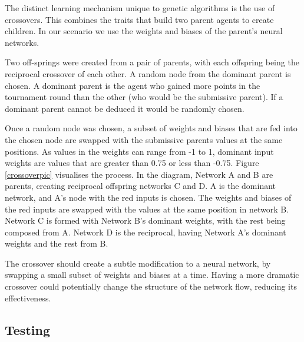\documentclass[12pt,a4paper]{article}
\begin{document}
            The distinct learning mechanism unique to genetic algorithms is the use of crossovers. This combines the traits that build two parent agents to create children. In our scenario we use the weights and biases of the parent's neural networks.

            Two off-springs were created from a pair of parents, with each offspring being the reciprocal crossover of each other. 
            A random node from the dominant parent is chosen. A dominant parent is the agent who gained more points in the tournament round than the other (who would be the submissive parent). If a dominant parent cannot be deduced it would be randomly chosen. 

            Once a random node was chosen, a subset of weights and biases that are fed into the chosen node are swapped with the submissive parents values at the same positions. As values in the weights can range from -1 to 1, dominant input weights are values that are greater than 0.75 or less than -0.75. Figure \ref{crossoverpic} visualises the process. In the diagram, Network A and B are parents, creating reciprocal offspring networks C and D. A is the dominant network, and A's node with the red inputs is chosen. The weights and biases of the red inputs are swapped with the values at the same position in network B. Network C is formed with Network B's dominant weights, with the rest being composed from A. Network D is the reciprocal, having Network A's dominant weights and the rest from B.

            The crossover should create a subtle modification to a neural network, by swapping a small subset of weights and biases at a time. Having a more dramatic crossover could potentially change the structure of the network flow, reducing its effectiveness. 
            

    \subsection{Testing}
\end{document}
